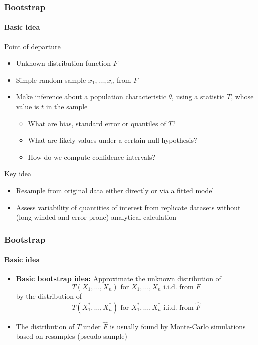 \documentclass[smaller,compress]{beamer}
\begin{document}
\begin{frame}\frametitle{Bootstrap}\framesubtitle{Basic idea}
\begin{block}{Point of departure}
    \begin{itemize}
      \item Unknown distribution function $F$
      \item Simple random sample $x_{1},\ldots ,x_{n}$ from $F$
      \item Make inference about a population characteristic $\theta$, using a statistic $T$, whose value is $t$ in the sample
      \begin{itemize}
        \item What are bias, standard error or quantiles of $T$?
        \item What are likely values under a certain null hypothesis?
        \item How do we compute confidence intervals?
      \end{itemize}
    \end{itemize}
\end{block}
\begin{block}{Key idea}
  \begin{itemize}
    \item Resample from original data either directly or via a fitted model
    \item Assess variability of quantities of interest from replicate datasets without (long-winded and error-prone) analytical calculation
  \end{itemize}
\end{block}
\end{frame}



\begin{frame}\frametitle{Bootstrap}\framesubtitle{Basic idea}
\begin{itemize}
    \item \textbf{Basic bootstrap idea:}
    Approximate the unknown distribution of
    \begin{equation*}
    T(X_{1},\ldots ,X_{n})\text{ for }X_{1},\ldots ,X_{n} \text{ i.i.d. from }F
    \end{equation*}
    by the distribution of
    \begin{equation*}
    T(X_{1}^{\ast },\ldots ,X_{n}^{\ast })\text{ for }X_{1}^{\ast},\ldots ,X_{n}^{\ast }\text{ i.i.d. from }\hat{F}
    \end{equation*}
    \item The distribution of $T$ under $\hat{F}$ is usually found by Monte-Carlo simulations based on resamples (pseudo sample)
\end{itemize}
\end{frame}
\end{document}

